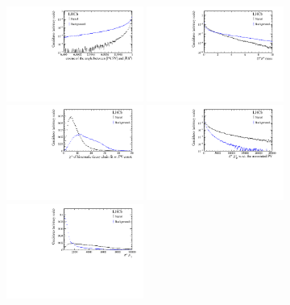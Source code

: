 \begin{figure}[tbp]
	\begin{center}
		\includegraphics[width=0.40\textwidth]{07selection/figs/BDTInputs/ab0_DIRA_OWNPV.pdf}
		\includegraphics[width=0.40\textwidth]{07selection/figs/BDTInputs/ab0_ENDVERTEX_CHI2.pdf}\\
		\includegraphics[width=0.40\textwidth]{07selection/figs/BDTInputs/ab0_FitPVConst_chi2_flat.pdf}
		\includegraphics[width=0.40\textwidth]{07selection/figs/BDTInputs/ab1_IPCHI2_OWNPV.pdf}\\
		\includegraphics[width=0.40\textwidth]{07selection/figs/BDTInputs/ab1_PT.pdf}

\end{center}
\end{figure}
